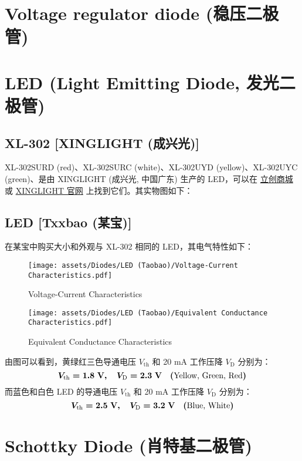 \documentclass[UTF8]{report}
\begin{document}
\section{Voltage regulator diode (稳压二极管)}
\section{LED (Light Emitting Diode, 发光二极管)}
\subsection{XL-302 [XINGLIGHT (成兴光)]}
XL-302SURD (red)、XL-302SURC (white)、XL-302UYD (yellow)、XL-302UYC (green)、是由 XINGLIGHT (成兴光, 中国广东) 生产的 LED，可以在 \href{https://so.szlcsc.com/global.html?k=XL-302U}{立创商城} 或 \href{http://www.xinglight.cn/index.php?s=cpzx&c=search&keyword=XL-302}{XINGLIGHT 官网} 上找到它们。其实物图如下：

\subsection{LED [Txxbao (某宝)]}
在某宝中购买大小和外观与 XL-302 相同的 LED，其电气特性如下：
\begin{figure}[H]\centering
    \texttt{[image: assets/Diodes/LED (Taobao)/Voltage-Current Characteristics.pdf]}
    \caption{Voltage-Current Characteristics}
\end{figure}
\begin{figure}[H]\centering
    \texttt{[image: assets/Diodes/LED (Taobao)/Equivalent Conductance Characteristics.pdf]}
    \caption{Equivalent Conductance Characteristics}
\end{figure}
由图可以看到，黄绿红三色导通电压 $V_\text{th}$ 和 20 mA 工作压降 $V_\text{D}$ 分别为：
\begin{equation}
\boldmath
V_\text{th} = 1.8 \ \mathrm{V},\quad V_\text{D} = 2.3 \ \mathrm{V} \quad (\text{Yellow, Green, Red})
\end{equation}
而蓝色和白色 LED 的导通电压 $V_\text{th}$ 和 20 mA 工作压降 $V_\text{D}$ 分别为：
\begin{equation}
\boldmath
V_\text{th} = 2.5 \ \mathrm{V},\quad V_\text{D} = 3.2 \ \mathrm{V} \quad (\text{Blue, White})
\end{equation}

\section{Schottky Diode (肖特基二极管)}
\end{document}
